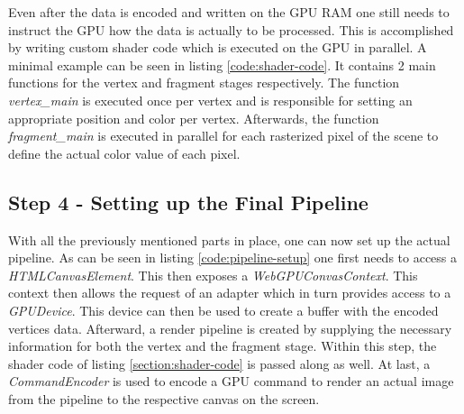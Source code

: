Even after the data is encoded and written on the GPU RAM one still needs to instruct the GPU how the data is actually to be processed. This is accomplished by writing custom
shader code which is executed on the GPU in parallel. A minimal example can be seen in listing \ref*{code:shader-code}.  It contains 2 main functions for the vertex and fragment stages respectively. 
The function \emph{vertex\_main} is executed once per vertex and is responsible for setting an appropriate position and color per vertex. Afterwards, the function \emph{fragment\_main} is 
executed in parallel for each rasterized pixel of the scene to define the actual color value of each pixel. 

\begin{samepage}
  
    {
      An exemplary code snippet of how to write WGSL Shader Code
    }},
    language=JavaScript,
    firstnumber=1,
    label=code:shader-code
    ]
    {listings/shader.wgsl}
\end{samepage}

%
%

\subsection{Step 4 - Setting up the Final Pipeline}

With all the previously mentioned parts in place, one can now set up the actual pipeline. As can be seen in listing \ref*{code:pipeline-setup} one first needs to access a \emph{HTMLCanvasElement}. This 
then exposes a \emph{WebGPUConvasContext}. This context then allows the request of an adapter which in turn provides access to a \emph{GPUDevice}.
This device can then be used to create a buffer with the encoded vertices data. Afterward, a render pipeline is created by supplying the necessary information for both the vertex and the fragment stage.
Within this step, the shader code of listing \ref*{section:shader-code} is passed along as well. At last, a \emph{CommandEncoder} is used to encode a GPU command to render an actual image from the pipeline to the respective canvas on the screen. 

